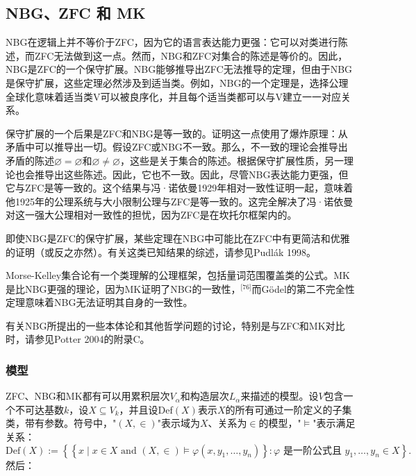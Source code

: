 \subsection{NBG、ZFC 和 MK}  
NBG在逻辑上并不等价于ZFC，因为它的语言表达能力更强：它可以对类进行陈述，而ZFC无法做到这一点。然而，NBG和ZFC对集合的陈述是等价的。因此，NBG是ZFC的一个保守扩展。NBG能够推导出ZFC无法推导的定理，但由于NBG是保守扩展，这些定理必然涉及到适当类。例如，NBG的一个定理是，选择公理全球化意味着适当类V可以被良序化，并且每个适当类都可以与V建立一一对应关系。

保守扩展的一个后果是ZFC和NBG是等一致的。证明这一点使用了爆炸原理：从矛盾中可以推导出一切。假设ZFC或NBG不一致。那么，不一致的理论会推导出矛盾的陈述\(\varnothing = \varnothing\)和\(\varnothing \ne \varnothing\)，这些是关于集合的陈述。根据保守扩展性质，另一理论也会推导出这些陈述。因此，它也不一致。因此，尽管NBG表达能力更强，但它与ZFC是等一致的。这个结果与冯·诺依曼1929年相对一致性证明一起，意味着他1925年的公理系统与大小限制公理与ZFC是等一致的。这完全解决了冯·诺依曼对这一强大公理相对一致性的担忧，因为ZFC是在坎托尔框架内的。

即使NBG是ZFC的保守扩展，某些定理在NBG中可能比在ZFC中有更简洁和优雅的证明（或反之亦然）。有关这类已知结果的综述，请参见Pudlák 1998。

Morse-Kelley集合论有一个类理解的公理框架，包括量词范围覆盖类的公式。MK是比NBG更强的理论，因为MK证明了NBG的一致性，\(^\text{[76]}\)而Gödel的第二不完全性定理意味着NBG无法证明其自身的一致性。

有关NBG所提出的一些本体论和其他哲学问题的讨论，特别是与ZFC和MK对比时，请参见Potter 2004的附录C。
\subsubsection{模型}  
ZFC、NBG和MK都有可以用累积层次\(V_\alpha\)和构造层次\(L_\alpha\)来描述的模型。设\(V\)包含一个不可达基数\(k\)，设\(X \subseteq V_k\)，并且设Def\((X)\)表示\(X\)的所有可通过一阶定义的子集类，带有参数。符号中，"\((X, \in)\)"表示域为\(X\)、关系为\(\in\)的模型，"\(\models\)"表示满足关系：
\[
\text{Def}(X) := \left\{ \left\{ x \mid x \in X \text{ and } (X, \in) \models \varphi(x, y_1, \ldots, y_n) \right\} : \varphi \text{ 是一阶公式且 } y_1, \ldots, y_n \in X \right\}.~
\]
然后：

